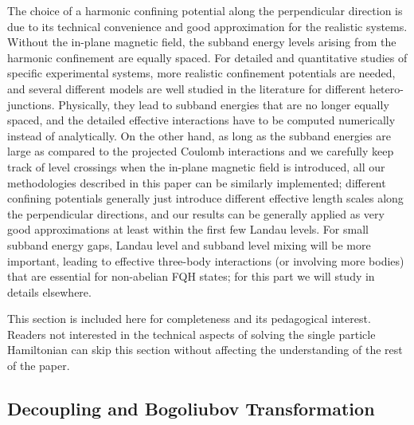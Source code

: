 \documentclass[twocolumn,showpacs,amsmath,amstex,amssymb,mathfonts,prb]{revtex4-1}
\begin{document}
The choice of a harmonic confining potential along the perpendicular direction is due to its technical convenience and good approximation for the realistic systems. Without the in-plane magnetic field, the subband energy levels arising from the harmonic confinement are equally spaced. For detailed and quantitative studies of specific experimental systems, more realistic confinement potentials are needed, and several different models are well studied in the literature for different hetero-junctions\cite{peterson08}. Physically, they lead to subband energies that are no longer equally spaced, and the detailed effective interactions have to be computed numerically instead of analytically. On the other hand, as long as the subband energies are large as compared to the projected Coulomb interactions and we carefully keep track of level crossings when the in-plane magnetic field is introduced, all our methodologies described in this paper can be similarly implemented; different confining potentials generally just introduce different effective length scales along the perpendicular directions\cite{zlatko}, and our results can be generally applied as very good approximations at least within the first few Landau levels. For small subband energy gaps, Landau level and subband level mixing will be more important, leading to effective three-body interactions (or involving more bodies) that are essential for non-abelian FQH states; for this part we will study in details elsewhere.

This section is included here for completeness and its pedagogical interest. Readers not interested in the technical aspects of solving the single particle Hamiltonian can skip this section without affecting the understanding of the rest of the paper.

\subsection{Decoupling and Bogoliubov Transformation}
 
\end{document}
